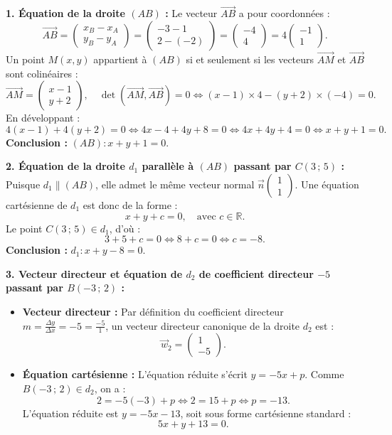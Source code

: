 \documentclass[11pt,a4paper]{article}
\newcommand{\R}{\mathbb{R}}
\newcommand{\vect}[1]{\overrightarrow{#1}}
\renewcommand{\det}{\operatorname{det}}
\begin{document}
\begin{correctionbox}
\textbf{1. Équation de la droite $(AB)$ :}
Le vecteur $\vect{AB}$ a pour coordonnées :
\[
\vect{AB} = \begin{pmatrix} x_B - x_A \\ y_B - y_A \end{pmatrix} = \begin{pmatrix} -3 - 1 \\ 2 - (-2) \end{pmatrix} = \begin{pmatrix} -4 \\ 4 \end{pmatrix} = 4 \begin{pmatrix} -1 \\ 1 \end{pmatrix}.
\]
Un point $M(x, y)$ appartient à $(AB)$ si et seulement si les vecteurs $\vect{AM}$ et $\vect{AB}$ sont colinéaires :
\[
\vect{AM} = \begin{pmatrix} x - 1 \\ y + 2 \end{pmatrix}, \quad \det(\vect{AM}, \vect{AB}) = 0 \iff (x - 1) \times 4 - (y + 2) \times (-4) = 0.
\]
En développant :
\[
4(x - 1) + 4(y + 2) = 0 \iff 4x - 4 + 4y + 8 = 0 \iff 4x + 4y + 4 = 0 \iff x + y + 1 = 0.
\]
\textbf{Conclusion :} $(AB) : x + y + 1 = 0$.

\textbf{2. Équation de la droite $d_1$ parallèle à $(AB)$ passant par $C(3\,;\,5)$ :}
Puisque $d_1 \parallel (AB)$, elle admet le même vecteur normal $\vec{n}\begin{pmatrix} 1 \\ 1 \end{pmatrix}$. Une équation cartésienne de $d_1$ est donc de la forme :
\[
x + y + c = 0, \quad \text{avec } c \in \R.
\]
Le point $C(3\,;\,5) \in d_1$, d'où :
\[
3 + 5 + c = 0 \iff 8 + c = 0 \iff c = -8.
\]
\textbf{Conclusion :} $d_1 : x + y - 8 = 0$.

\textbf{3. Vecteur directeur et équation de $d_2$ de coefficient directeur $-5$ passant par $B(-3\,;\,2)$ :}
\begin{itemize}[leftmargin=1cm]
    \item \textbf{Vecteur directeur :} Par définition du coefficient directeur $m = \frac{\Delta y}{\Delta x} = -5 = \frac{-5}{1}$, un vecteur directeur canonique de la droite $d_2$ est :
    \[
    \vec{w}_2 = \begin{pmatrix} 1 \\ -5 \end{pmatrix}.
    \]
    \item \textbf{Équation cartésienne :} L'équation réduite s'écrit $y = -5x + p$.
    Comme $B(-3\,;\,2) \in d_2$, on a :
    \[
    2 = -5(-3) + p \iff 2 = 15 + p \iff p = -13.
    \]
    L'équation réduite est $y = -5x - 13$, soit sous forme cartésienne standard :
    \[
    5x + y + 13 = 0.
    \]
\end{itemize}


\end{correctionbox}
\end{document}
